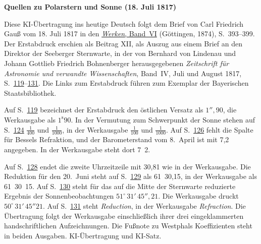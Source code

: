 \clearpage\thispagestyle{empty}
\begin{center}\textbf{Quellen zu Polarstern und Sonne (18. Juli 1817)}\end{center}
\noindent Diese KI-Übertragung ins heutige Deutsch folgt dem Brief von Carl Friedrich Gauß vom 18. Juli 1817 in den \href{https://gdz.sub.uni-goettingen.de/id/PPN236007467}{\textit{Werken}, Band~VI} (Göttingen, 1874), S.~393--399. Der Erstabdruck erschien als Beitrag XII, als Auszug aus einem Brief an den Direktor der Seeberger Sternwarte, in der von Bernhard von Lindenau und Johann Gottlieb Friedrich Bohnenberger herausgegebenen \textit{Zeitschrift für Astronomie und verwandte Wissenschaften}, Band~IV, Juli und August 1817, S.~\href{https://api.digitale-sammlungen.de/iiif/image/v2/bsb10061006_00119/full/1600,/0/default.jpg}{119}--\href{https://api.digitale-sammlungen.de/iiif/image/v2/bsb10061006_00131/full/1600,/0/default.jpg}{131}. Die Links zum Erstabdruck führen zum Exemplar der Bayerischen Staatsbibliothek.
\par\smallskip\noindent Auf S.~\href{https://api.digitale-sammlungen.de/iiif/image/v2/bsb10061006_00119/full/1600,/0/default.jpg}{119} bezeichnet der Erstabdruck den östlichen Versatz als $1''{,}90$, die Werkausgabe als $1^{\mathrm s}90$. In der Vermutung zum Schwerpunkt der Sonne stehen auf S.~\href{https://api.digitale-sammlungen.de/iiif/image/v2/bsb10061006_00124/full/1600,/0/default.jpg}{124} $\frac{1}{400}$ und $\frac{1}{1000}$, in der Werkausgabe $\frac{1}{100}$ und $\frac{1}{1000}$. Auf S.~\href{https://api.digitale-sammlungen.de/iiif/image/v2/bsb10061006_00126/full/1600,/0/default.jpg}{126} fehlt die Spalte für Bessels Refraktion, und der Barometerstand vom 8.~April ist mit 7,2 angegeben. In der Werkausgabe steht dort 7~2.
\par\smallskip\noindent Auf S.~\href{https://api.digitale-sammlungen.de/iiif/image/v2/bsb10061006_00128/full/1600,/0/default.jpg}{128} endet die zweite Uhrzeitzeile mit 30,81 wie in der Werkausgabe. Die Reduktion für den 20.~Juni steht auf S.~\href{https://api.digitale-sammlungen.de/iiif/image/v2/bsb10061006_00129/full/1600,/0/default.jpg}{129} als 61~30,15, in der Werkausgabe als 61~30~15. Auf S.~\href{https://api.digitale-sammlungen.de/iiif/image/v2/bsb10061006_00130/full/1600,/0/default.jpg}{130} steht für das auf die Mitte der Sternwarte reduzierte Ergebnis der Sonnenbeobachtungen $51^\circ\,31'\,45''{,}21$. Die Werkausgabe druckt $50^\circ\,31'\,45''21$. Auf S.~\href{https://api.digitale-sammlungen.de/iiif/image/v2/bsb10061006_00131/full/1600,/0/default.jpg}{131} steht \textit{Reduction}, in der Werkausgabe \textit{Refraction}. Die Übertragung folgt der Werkausgabe einschließlich ihrer drei eingeklammerten handschriftlichen Aufzeichnungen. Die Fußnote zu Westphals Koeffizienten steht in beiden Ausgaben. KI-Übertragung und KI-Satz.
\clearpage
